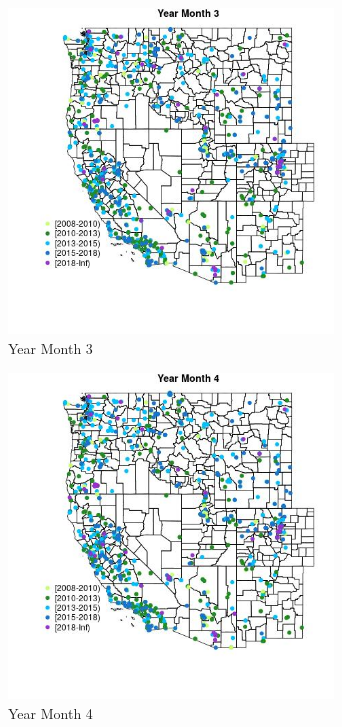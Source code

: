 \begin{figure} 
\centering  
\includegraphics[width=0.77\textwidth]{Code_Outputs/Report_ML_input_PM25_Step4_part_e_de_duplicated_aveswNAs_MapObsMo3Year.jpg} 
\caption{\label{fig:Report_ML_input_PM25_Step4_part_e_de_duplicated_aveswNAsMapObsMo3Year}Year Month 3} 
\end{figure} 
 

\begin{figure} 
\centering  
\includegraphics[width=0.77\textwidth]{Code_Outputs/Report_ML_input_PM25_Step4_part_e_de_duplicated_aveswNAs_MapObsMo4Year.jpg} 
\caption{\label{fig:Report_ML_input_PM25_Step4_part_e_de_duplicated_aveswNAsMapObsMo4Year}Year Month 4} 
\end{figure} 
 

